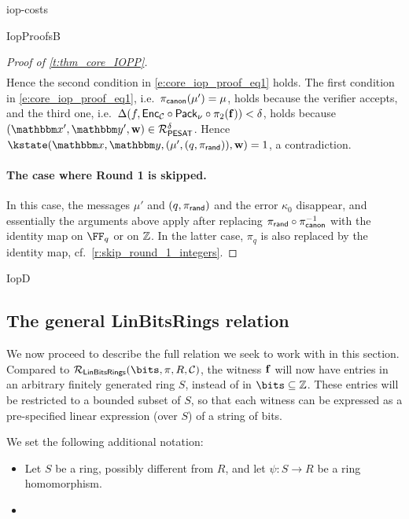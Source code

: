 \begin{lncsappendix}{iop-costs}
\begin{lncsmove}{IopProofsB}
\begin{proof}[Proof of \cref{t:thm_core_IOPP}]
\begin{align*}
\end{align*}
%
Hence the second condition in \eqref{e:core_iop_proof_eq1} holds. The first condition in \eqref{e:core_iop_proof_eq1}, i.e.\ $\pi_{\mathsf{canon}}(\mu')=\mu$, holds because the verifier accepts, and the third one, i.e.\ $\Delta(f, \mathsf{Enc}_{\mathcal{C}}\circ \mathsf{Pack}_\nu \circ\pi_2(\mathbf{f}))<\delta$, holds because $(\inp',\oracle',\ww)\in \PESAT^{\delta}$. Hence $\kstate(\inp,\lncsbreak\oracle,\lncsbreak(\mu', (q,\pirand)),\ww)=1$, a contradiction.




\paragraph{The case where Round 1 is skipped.}  In this case, the messages $\mu'$ and $(q,\pi_{\mathsf{rand}})$ and the error $\kappa_0$ disappear, and essentially the arguments above apply after replacing $\pi_{\mathsf{rand}}\circ \pi_{\mathsf{canon}}^{-1}$ with the identity map on $\FF_q$ or on $\mathbb{Z}$. In the latter case,  $\pi_q$ is also replaced by the identity map, cf.\ \cref{r:skip_round_1_integers}.

\end{proof}
\end{lncsmove}








\begin{lncsmove}{IopD}
\subsection{The general LinBitsRings relation}\label{s:general_LinBitsDual}


\renewcommand{\modulemorphism}{\psi}
\renewcommand{\ringmorphism}{\psi}
\renewcommand{\moduleonebound}{{S_{\leq B}^{<D_S}}}

We now proceed to describe the full relation we seek to work with in this section.  Compared to $\LinBitsDual(\bits, \pi, R, \cC)$,   the witness $\mathbf{f}$ will now have entries in an arbitrary finitely generated ring $S$,  instead of in $\bits\subseteq \ZZ$.  These entries will be restricted to a bounded subset of $S$, so that each witness can be expressed as a pre-specified linear expression (over $S$) of a string of bits.


We set the following additional notation:
\iflncs\else\begin{itemize}[leftmargin=*]\fi
 \iflncs\else\item\fi{} Let $S$ be a ring, possibly different from $R$, and let $\psi:S \to R$ be a ring homomorphism. %
\iflncs\else\item \fi


\end{itemize}
\end{lncsmove}
\end{lncsappendix}
